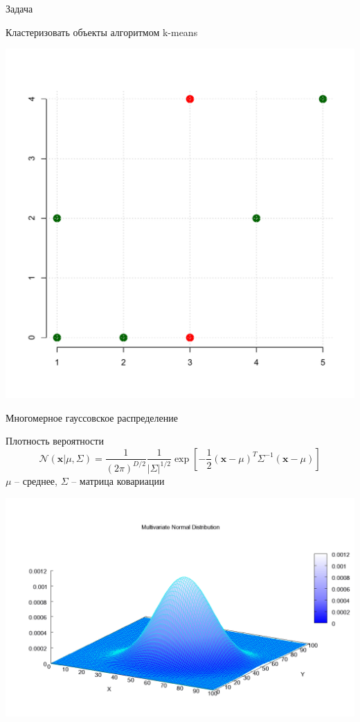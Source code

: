 \documentclass[10pt,a4paper]{beamer}
\begin{document}

\begin{frame}{Задача}

Кластеризовать объекты алгоритмом k-means

\begin{center}
\includegraphics[scale=0.4]{images/problem.pdf}
\end{center}

\end{frame}


\begin{frame}{Многомерное гауссовское распределение}

Плотность вероятности
\[
\mathcal{N}(\mathbf{x} | \mu, \Sigma) = \frac{1}{(2\pi)^{D/2}}\frac{1}{|\Sigma|^{1/2}} \exp\left[{-\frac{1}{2} (\mathbf{x} - \mu)^T \Sigma^{-1} (\mathbf{x} - \mu)}\right]
\]
$\mu$ -- среднее, $\Sigma$ -- матрица ковариации

\begin{center}
\includegraphics[scale=0.17]{images/multi.png}
\end{center}

\end{frame}
\end{document}
